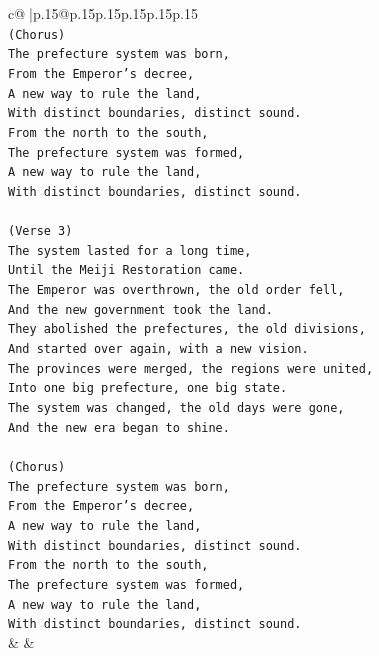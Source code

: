 \documentclass{article}
\begin{document}
{\begin{supertabular}{c@{$\;$}|p{.15\linewidth}@{}p{.15\linewidth}p{.15\linewidth}p{.15\linewidth}p{.15\linewidth}p{.15\linewidth}}
{{{\\ 
\texttt{(Chorus)} \\
\texttt{The prefecture system was born,} \\
\texttt{From the Emperor's decree,} \\
\texttt{A new way to rule the land,} \\
\texttt{With distinct boundaries, distinct sound.} \\
\texttt{From the north to the south,} \\
\texttt{The prefecture system was formed,} \\
\texttt{A new way to rule the land,} \\
\texttt{With distinct boundaries, distinct sound.} \\
\\ 
\texttt{(Verse 3)} \\
\texttt{The system lasted for a long time,} \\
\texttt{Until the Meiji Restoration came.} \\
\texttt{The Emperor was overthrown, the old order fell,} \\
\texttt{And the new government took the land.} \\
\texttt{They abolished the prefectures, the old divisions,} \\
\texttt{And started over again, with a new vision.} \\
\texttt{The provinces were merged, the regions were united,} \\
\texttt{Into one big prefecture, one big state.} \\
\texttt{The system was changed, the old days were gone,} \\
\texttt{And the new era began to shine.} \\
\\ 
\texttt{(Chorus)} \\
\texttt{The prefecture system was born,} \\
\texttt{From the Emperor's decree,} \\
\texttt{A new way to rule the land,} \\
\texttt{With distinct boundaries, distinct sound.} \\
\texttt{From the north to the south,} \\
\texttt{The prefecture system was formed,} \\
\texttt{A new way to rule the land,} \\
\texttt{With distinct boundaries, distinct sound.} \\
            }
        }
    }
    & & \\ \\


\end{supertabular}}
\end{document}
